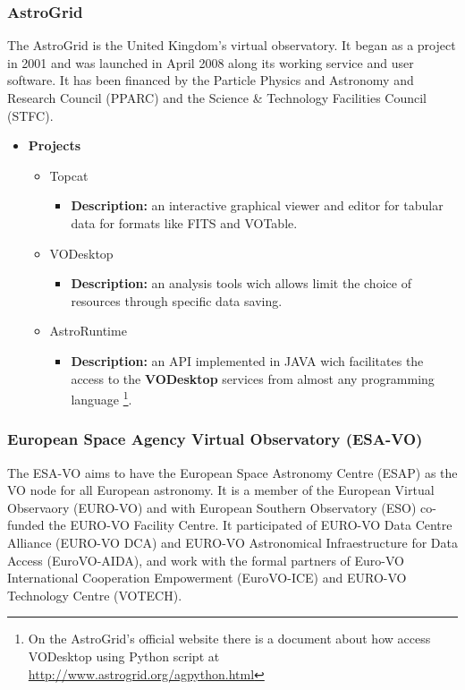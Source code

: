 \subsubsection{AstroGrid}
The AstroGrid \cite{website:astrogrid-home} is the United Kingdom's virtual
observatory. It began as a project in 2001 and was launched in April 2008 along
its working service and user software. It has been financed by the Particle
Physics and Astronomy and Research Council (PPARC) and the Science \& Technology
Facilities Council (STFC).

\begin{itemize}
\item \textbf{Projects}
\begin{itemize}
\item Topcat
\begin{itemize}
\item \textbf{Description:} an interactive graphical viewer and editor for
tabular data for formats like FITS and VOTable.
\end{itemize}
\item VODesktop
\begin{itemize}
\item \textbf{Description:} an analysis tools wich allows limit the choice of
resources through specific data saving.
\end{itemize}
\item AstroRuntime
\begin{itemize}
\item \textbf{Description:} an API implemented in JAVA wich facilitates the
access to the \textbf{VODesktop} services from almost any programming language
\footnote{On the AstroGrid's official website there is a document about how
access VODesktop using Python script at
\url{http://www.astrogrid.org/agpython.html}}.
\end{itemize}
\end{itemize}
\end{itemize}

\subsubsection{European Space Agency Virtual Observatory (ESA-VO)}
The ESA-VO \cite{website:esa-vo-home} aims to have the European Space Astronomy
Centre (ESAP) as the VO node for all European astronomy. It is a member of the
European Virtual Observaory (EURO-VO) and with European Southern Observatory
(ESO) co-funded the EURO-VO Facility Centre. It participated of EURO-VO Data
Centre Alliance (EURO-VO DCA) and EURO-VO Astronomical Infraestructure for Data
Access (EuroVO-AIDA), and work with the formal partners of Euro-VO International
Cooperation Empowerment (EuroVO-ICE) and EURO-VO Technology Centre (VOTECH).

